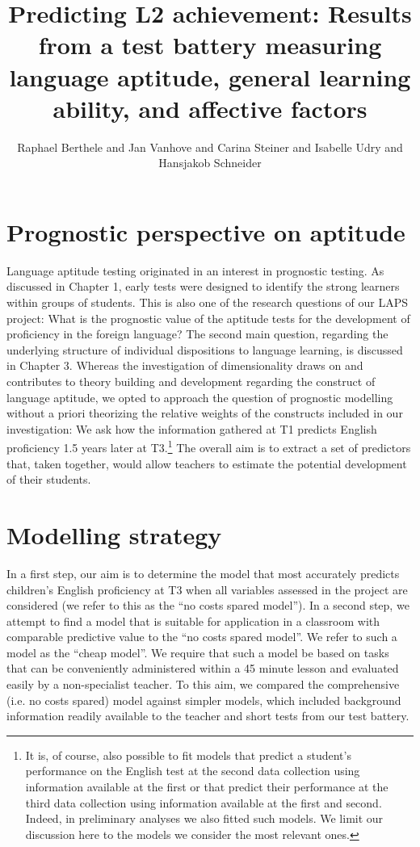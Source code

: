\documentclass[output=paper]{langsci/langscibook}
\author{Raphael Berthele\orcid{}\affiliation{University of Fribourg, Institut de Plurilinguisme} and Jan Vanhove\orcid{}\affiliation{University of Fribourg, Institut de Plurilinguisme} and Carina Steiner\orcid{}\affiliation{University of Berne, Center for the Study of Language and Society} and Isabelle Udry\orcid{}\affiliation{University of Fribourg, Institut de Plurilinguisme; Zurich University of Teacher Education} and Hansjakob Schneider\orcid{}\affiliation{Zurich University of Teacher Education}}
\title[Predicting L2 achievement]
      {Predicting L2 achievement: Results from a test battery measuring language aptitude, general learning ability, and affective factors}
\begin{document}
\maketitle \label{ch:4}


\section{Prognostic perspective on aptitude}

Language aptitude testing originated in an interest in prognostic testing. As discussed in Chapter 1, early tests were designed to identify the strong learners within groups of students. This is also one of the research questions of our LAPS project: What is the prognostic value of the aptitude tests for the development of proficiency in the foreign language? The second main question, regarding the underlying structure of individual dispositions to language learning, is discussed in Chapter 3.  Whereas the investigation of dimensionality draws on and contributes to theory building and development regarding the construct of language aptitude, we opted to approach the question of prognostic modelling without a priori theorizing the relative weights of the constructs included in our investigation: We ask how the information gathered at T1 predicts English proficiency 1.5 years later at T3.\footnote{It is, of course, also possible to fit models that predict a student’s performance on the English test at the second data collection using information available at the first or that predict their performance at the third data collection using information available at the first and second. Indeed, in preliminary analyses we also fitted such models. We limit our discussion here to the models we consider the most relevant ones.} The overall aim is to extract a set of predictors that, taken together, would allow teachers to estimate the potential development of their students.

\section{Modelling strategy}

In a first step, our aim is to determine the model that most accurately predicts children’s English proficiency at T3 when all variables assessed in the project are considered (we refer to this as the ``no costs spared model''). In a second step, we attempt to find a model that is suitable for application in a classroom with comparable predictive value to the ``no costs spared model''. We refer to such a model as the ``cheap model''. We require that such a model be based on tasks that can be conveniently administered within a 45 minute lesson and evaluated easily by a non-specialist teacher. To this aim, we compared the comprehensive (i.e. no costs spared) model against simpler models, which included background information readily available to the teacher and short tests from our test battery.
\end{document}

